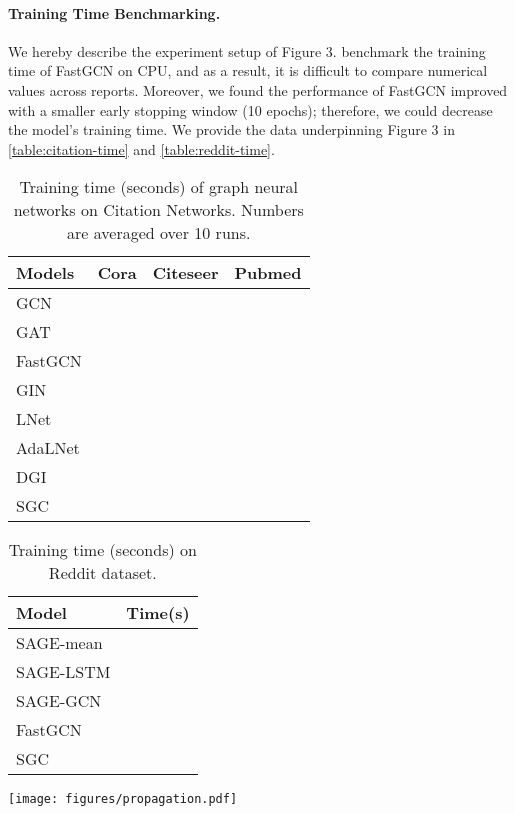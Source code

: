 \documentclass{article}
\newcommand{\method}{SGC}
\begin{document}
\paragraph{Training Time Benchmarking.} We hereby describe the experiment setup of Figure 3.
\citet{FastGCN} benchmark the training time of FastGCN on CPU, and as a result, it is difficult to compare numerical values across reports.
Moreover, we found the performance of FastGCN improved with a smaller early stopping window (10 epochs); therefore, we could decrease the model's training time.
We provide the data underpinning Figure 3 in \autoref{table:citation-time} and \autoref{table:reddit-time}.
\begin{table}[htb!]
\centering
        \small
        \caption{Training time (seconds) of graph neural networks on Citation Networks. Numbers are averaged over 10 runs.}
        \label{table:citation-time}
        \begin{tabular}{l|c|c|c}
        \toprule
        Models & Cora & Citeseer & Pubmed \\ 
        \midrule
GCN &  &  &  \\
GAT &  &  &   \\
        FastGCN &  &  &  \\
        GIN &  &   &  \\
        LNet &  &   &  \\
        AdaLNet &  &  &  \\
        DGI &  &  & \\
        {\color{modelblue} \method{}} &  &  &  \\
         \bottomrule
        \end{tabular}
\end{table}
\begin{table}[htb!]
        \centering
        \small
        \caption{Training time (seconds) on Reddit dataset.}
        \label{table:reddit-time}
        \begin{tabular}{l|l}
        \toprule
        Model & Time(s)  \\
         \midrule
        SAGE-mean & \\
        SAGE-LSTM & \\
        SAGE-GCN & \\
        FastGCN & \\
        {\color{modelblue} \method{}} &  \\
        \bottomrule
        \end{tabular}
\end{table}
\begin{figure*}[htb] 
\centering
\texttt{[image: figures/propagation.pdf]}
\caption{Validation accuracy with \method{} using different propagation matrices.}
\label{fig:propagation-ablation}
\end{figure*}
\end{document}
